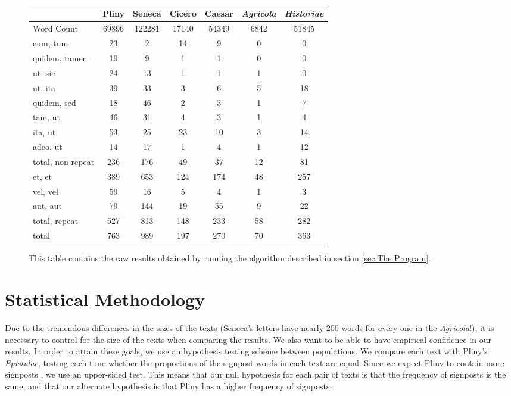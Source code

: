 \begin{figure*}[t]
  \begin{center}
    \begin{tabular}{| l || c | c | c | c | c | c |}
      \hline
      & Pliny & Seneca & Cicero & Caesar & \textit{Agricola} & \textit{Historiae}  \\ \hline \hline
      Word Count & 69896 & 122281 & 17140 & 54349 & 6842 & 51845 \\ \hline \hline
      cum, tum & 23 & 2 & 14 & 9 & 0 & 0 \\ \hline
      quidem, tamen & 19 & 9 & 1 & 1 & 0 & 0 \\ \hline
      ut, sic & 24 & 13 & 1 & 1 & 1 & 0 \\ \hline
      ut, ita & 39 & 33 & 3 & 6 & 5 & 18 \\ \hline
      quidem, sed & 18 & 46 & 2 & 3 & 1 & 7 \\ \hline
      tam, ut & 46 & 31 & 4 & 3 & 1 & 4 \\ \hline
      ita, ut & 53 & 25 & 23 & 10 & 3 & 14 \\ \hline
      adeo, ut & 14 & 17 & 1 & 4 & 1 & 12 \\ \hline \hline
      total, non-repeat & 236 & 176 & 49 & 37 & 12 & 81 \\ \hline \hline
      et, et & 389 & 653 & 124 & 174 & 48 & 257 \\ \hline
      vel, vel & 59 & 16 & 5 & 4 & 1 & 3 \\ \hline
      aut, aut & 79 & 144 & 19 & 55 & 9 & 22 \\ \hline \hline
      total, repeat & 527 & 813 & 148 & 233 & 58 & 282 \\ \hline \hline
      total & 763 & 989 & 197 & 270 & 70 & 363 \\
      \hline
    \end{tabular}
  \end{center}
  \caption{\label{fig:results}This table contains the raw results obtained by running the algorithm described in section \ref{sec:The Program}.}
\end{figure*}

\section{Statistical Methodology}
\label{sec:stats}

Due to the tremendous differences in the sizes of the texts (Seneca's letters have nearly 200 words for every one in the \textit{Agricola}!), it is necessary to control for the size of the texts when comparing the results. We also want to be able to have empirical confidence in our results. In order to attain these goals, we use an hypothesis testing scheme between populations. We compare each text with Pliny's \textit{Epistulae}, testing each time whether the proportions of the signpost words in each text are equal. Since we expect Pliny to contain more signposts \cite{Woodmanpm}, we use an upper-sided test. This means that our null hypothesis for each pair of texts is that the frequency of signposts is the same, and that our alternate hypothesis is that Pliny has a higher frequency of signposts.

